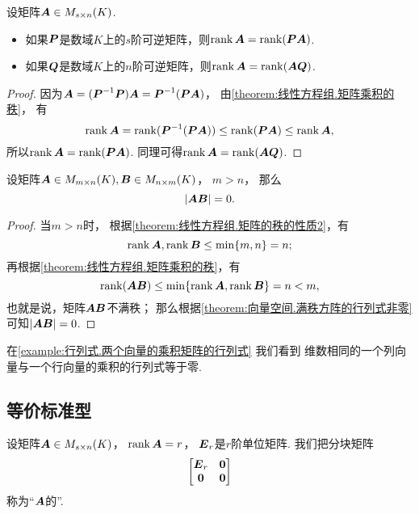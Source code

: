 \begin{corollary}\label{theorem:矩阵乘积的秩.与可逆矩阵相乘不变秩}
设矩阵\(\boldsymbol{A} \in M_{s \times n}(K)\).
\begin{itemize}
	\item 如果\(\boldsymbol{P}\)是数域\(K\)上的\(s\)阶可逆矩阵，则\(\rank\boldsymbol{A} = \rank(\boldsymbol{P}\boldsymbol{A})\).
	\item 如果\(\boldsymbol{Q}\)是数域\(K\)上的\(n\)阶可逆矩阵，则\(\rank\boldsymbol{A} = \rank(\boldsymbol{A}\boldsymbol{Q})\).
\end{itemize}
\begin{proof}
因为\(\boldsymbol{A} = (\boldsymbol{P}^{-1} \boldsymbol{P}) \boldsymbol{A} = \boldsymbol{P}^{-1} (\boldsymbol{P} \boldsymbol{A})\)，
由\cref{theorem:线性方程组.矩阵乘积的秩}，
有\[
	\rank\boldsymbol{A} = \rank(\boldsymbol{P}^{-1}(\boldsymbol{P}\boldsymbol{A})) \leq \rank(\boldsymbol{P}\boldsymbol{A}) \leq \rank\boldsymbol{A},
\]
所以\(\rank\boldsymbol{A} = \rank(\boldsymbol{P}\boldsymbol{A})\).
同理可得\(\rank\boldsymbol{A} = \rank(\boldsymbol{A}\boldsymbol{Q})\).
\end{proof}
\end{corollary}

\begin{theorem}\label{theorem:矩阵乘积的秩.多行少列矩阵与少行多列矩阵的乘积的行列式}
设矩阵\(\boldsymbol{A} \in M_{m \times n}(K),
\boldsymbol{B} \in M_{n \times m}(K)\)，
\(m > n\)，
那么\[
	\abs{\boldsymbol{A} \boldsymbol{B}} = 0.
\]
\begin{proof}
当\(m>n\)时，
根据\cref{theorem:线性方程组.矩阵的秩的性质2}，有\[
	\rank\boldsymbol{A},\rank\boldsymbol{B} \leq \min\{m,n\} = n;
\]
再根据\cref{theorem:线性方程组.矩阵乘积的秩}，有\[
	\rank(\boldsymbol{A} \boldsymbol{B}) \leq \min\{\rank\boldsymbol{A},\rank\boldsymbol{B}\} = n < m,
\]
也就是说，矩阵\(\boldsymbol{A} \boldsymbol{B}\)不满秩；
那么根据\cref{theorem:向量空间.满秩方阵的行列式非零} 可知\(\abs{\boldsymbol{A} \boldsymbol{B}} = 0\).
\end{proof}
\end{theorem}
\begin{remark}
在\cref{example:行列式.两个向量的乘积矩阵的行列式} 我们看到
维数相同的一个列向量与一个行向量的乘积的行列式等于零.
\end{remark}

\subsection{等价标准型}
\begin{definition}
设矩阵\(\boldsymbol{A} \in M_{s \times n}(K)\)，
\(\rank\boldsymbol{A} = r\)，
\(\boldsymbol{E}_r\)是\(r\)阶单位矩阵.
我们把分块矩阵\[
	\begin{bmatrix}
		\boldsymbol{E}_r & \boldsymbol0 \\
		\boldsymbol0 & \boldsymbol0
	\end{bmatrix}
\]
称为“\(\boldsymbol{A}\)的”.
\end{definition}

